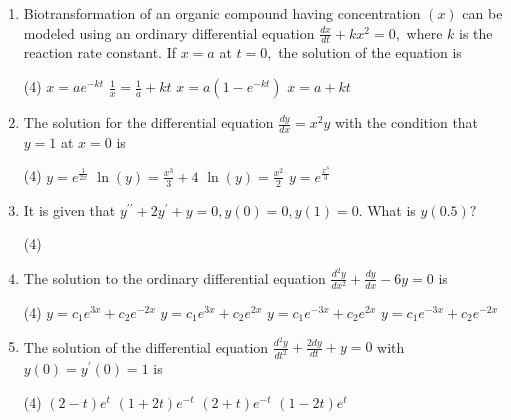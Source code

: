 \begin{enumerate}[label=\color{ocre}\textbf{\arabic*.}]
	\begin{tasks}(4)
		\task[\textbf{a.}]$e^{-2}$ 
		\task[\textbf{b.}]$2 e^{-2}$
		\task[\textbf{c.}] $2 e^{2}$
		\task[\textbf{d.}]$e^{2}$
	\end{tasks}
	\item Biotransformation of an organic compound having concentration $(x)$ can be modeled using an ordinary differential equation $\frac{d x}{d t}+k x^{2}=0,$ where $k$ is the reaction rate constant. If $x=a$ at $t=0,$ the solution of the equation is
	\begin{tasks}(4)
		\task[\textbf{a.}]$x=a e^{-k t}$ 
		\task[\textbf{b.}]$\frac{1}{x}=\frac{1}{a}+k t$
		\task[\textbf{c.}]$x=a\left(1-e^{-k t}\right)$ 
		\task[\textbf{d.}]$x=a+k t$
	\end{tasks}
	\item The solution for the differential equation $\frac{d y}{d x}=x^{2} y$ with the condition that $y=1$ at $x=0$ is
	\begin{tasks}(4)
		\task[\textbf{a.}] $y=e^{\frac{1}{2 x}}$ 
		\task[\textbf{b.}] $\ln (y)=\frac{x^{3}}{3}+4$
		\task[\textbf{c.}] $\ln (y)=\frac{x^{2}}{2}$ 
		\task[\textbf{d.}] $y=e^{\frac{x^{3}}{3}}$
	\end{tasks}
	\item It is given that $y^{\prime \prime}+2 y^{\prime}+y=0, y(0)=0, y(1)=0$.
	What is $y(0.5) ?$
	\begin{tasks}(4)
	\end{tasks}
	\item The solution to the ordinary differential equation $\frac{d^{2} y}{d x^{2}}+\frac{d y}{d x}-6 y=0$ is
	\begin{tasks}(4)
		\task[\textbf{a.}] $y=c_{1} e^{3 x}+c_{2} e^{-2 x}$ 
		\task[\textbf{b.}]$y=c_{1} e^{3 x}+c_{2} e^{2 x}$
		\task[\textbf{c.}] $y=c_{1} e^{-3 x}+c_{2} e^{2 x}$ 
		\task[\textbf{d.}] $y=c_{1} e^{-3 x}+c_{2} e^{-2 x}$
	\end{tasks}
	\item The solution of the differential equation $\frac{d^{2} y}{d t^{2}}+\frac{2 d y}{d t}+y=0$ with $y(0)=y^{\prime}(0)=1$ is
	
	\begin{tasks}(4)
		\task[\textbf{a.}] $(2-t) e^{t}$ 
		\task[\textbf{b.}]$(1+2 t) e^{-t}$
		\task[\textbf{c.}]$(2+t) e^{-t}$ 
		\task[\textbf{d.}]$(1-2 t) e^{t}$
	\end{tasks}
\end{enumerate}
